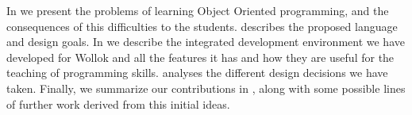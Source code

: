 \medskip 
In  we present the problems of learning Object Oriented programming, and the consequences of this difficulties to the students.  describes the proposed language and design goals. 
In  we describe the integrated development environment we have developed for Wollok and all the features it has and how they are useful for the teaching of programming skills.  analyses the different design decisions we have taken.
Finally, we summarize our contributions in ,
along with some possible lines of further work derived from this initial ideas. 


